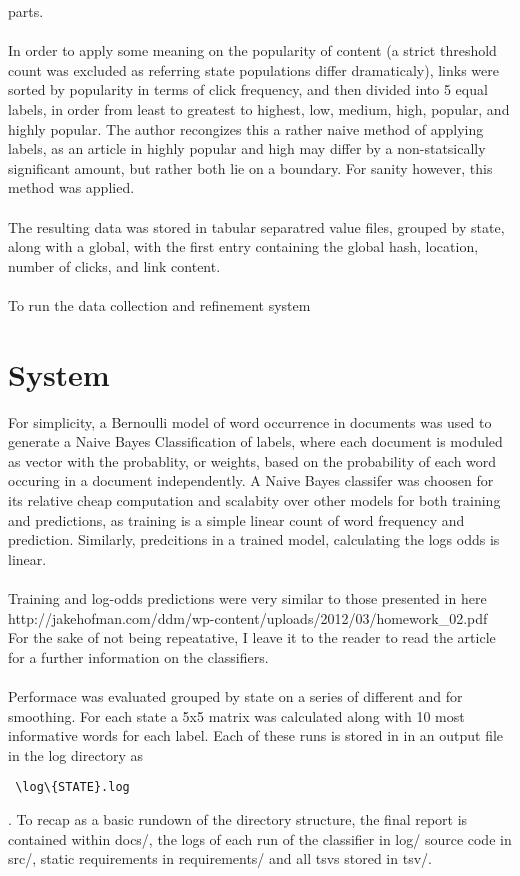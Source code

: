 \documentclass[11pt]{article}
\begin{document}
parts. \\
\\
In order to apply some meaning on the popularity of content (a strict threshold 
count was excluded as referring state populations differ dramaticaly), links 
were sorted by popularity in terms of click frequency, and then divided into 5
equal labels, in order from least to greatest to highest, low, medium, high, 
popular, and highly popular. The author recongizes this a rather 
naive method of applying labels, as an article in highly popular and high may 
differ by a non-statsically significant amount, but rather both lie on a 
boundary.  For sanity however, this method was applied.\\
\\
The resulting data was stored in tabular separatred value files, grouped by 
state, along with a global, with the first entry containing the global hash, location, number of 
clicks, and link content.\\ 
\\
To run the data collection and refinement system
\section{System}
For simplicity, a Bernoulli model of word occurrence in documents was used to 
generate a Naive Bayes Classification of labels, where each document is moduled 
as vector with the probablity, or weights, based on the probability of each 
word occuring in a document independently.  A Naive Bayes classifer was choosen 
for its relative cheap computation and scalabity over other models for both 
training and predictions, as training is a simple linear count of word 
frequency and prediction. Similarly, predcitions in a trained model, calculating
the logs odds is linear.\\
\\
Training and log-odds predictions were very similar to those presented in here
http://jakehofman.com/ddm/wp-content/uploads/2012/03/homework_02.pdf
For the sake of not being repeatative, I leave it to the reader to read the 
article for a further information on the classifiers.\\
\\
Performace was evaluated grouped by state on a series of different \alpha and 
\beta for smoothing.  For each state a 5x5 matrix was calculated along with 
10 most informative words for each label. Each of these runs is stored in in an output file in the log directory as 
\begin{verbatim} \log\{STATE}.log \end{verbatim}. To recap as a basic rundown of the directory structure, the final report is contained within docs/, the logs of each run of the classifier in log/ source code in src/, static requirements in requirements/ and all tsvs stored in tsv/.
\end{document}
